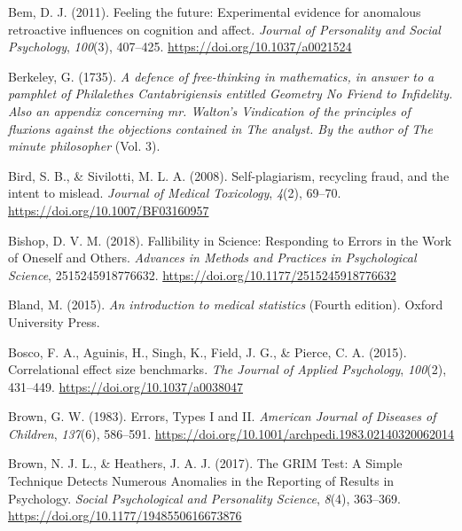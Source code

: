 \documentclass[
  letterpaper,
  DIV=11,
  numbers=noendperiod]{scrreprt}
\newlength{\cslhangindent}
\newlength{\cslentryspacingunit} %
\newenvironment{CSLReferences}[2] %
 {%
  \setlength{\parindent}{0pt}
  \ifodd #1
  \let\oldpar\par
  \def\par{\hangindent=\cslhangindent\oldpar}
  \fi
  \setlength{\parskip}{#2\cslentryspacingunit}
 }%
 {}
\begin{document}
\begin{CSLReferences}{1}{0}
\leavevmode{}%
Bem, D. J. (2011). Feeling the future: Experimental evidence for
anomalous retroactive influences on cognition and affect. \emph{Journal
of Personality and Social Psychology}, \emph{100}(3), 407--425.
\url{https://doi.org/10.1037/a0021524}

\leavevmode{}%
Berkeley, G. (1735). \emph{A defence of free-thinking in mathematics, in
answer to a pamphlet of {Philalethes Cantabrigiensis} entitled {Geometry
No Friend} to {Infidelity}. {Also} an appendix concerning mr. {Walton}'s
{Vindication} of the principles of fluxions against the objections
contained in {The} analyst. {By} the author of {The} minute philosopher}
(Vol. 3).

\leavevmode{}%
Bird, S. B., \& Sivilotti, M. L. A. (2008). Self-plagiarism, recycling
fraud, and the intent to mislead. \emph{Journal of Medical Toxicology},
\emph{4}(2), 69--70. \url{https://doi.org/10.1007/BF03160957}

\leavevmode{}%
Bishop, D. V. M. (2018). Fallibility in {Science}: {Responding} to
{Errors} in the {Work} of {Oneself} and {Others}. \emph{Advances in
Methods and Practices in Psychological Science}, 2515245918776632.
\url{https://doi.org/10.1177/2515245918776632}

\leavevmode{}%
Bland, M. (2015). \emph{An introduction to medical statistics} (Fourth
edition). {Oxford University Press}.

\leavevmode{}%
Bosco, F. A., Aguinis, H., Singh, K., Field, J. G., \& Pierce, C. A.
(2015). Correlational effect size benchmarks. \emph{The Journal of
Applied Psychology}, \emph{100}(2), 431--449.
\url{https://doi.org/10.1037/a0038047}

\leavevmode{}%
Brown, G. W. (1983). Errors, {Types I} and {II}. \emph{American Journal
of Diseases of Children}, \emph{137}(6), 586--591.
\url{https://doi.org/10.1001/archpedi.1983.02140320062014}

\leavevmode{}%
Brown, N. J. L., \& Heathers, J. A. J. (2017). The {GRIM Test}: {A
Simple Technique Detects Numerous Anomalies} in the {Reporting} of
{Results} in {Psychology}. \emph{Social Psychological and Personality
Science}, \emph{8}(4), 363--369.
\url{https://doi.org/10.1177/1948550616673876}


\end{CSLReferences}
\end{document}
